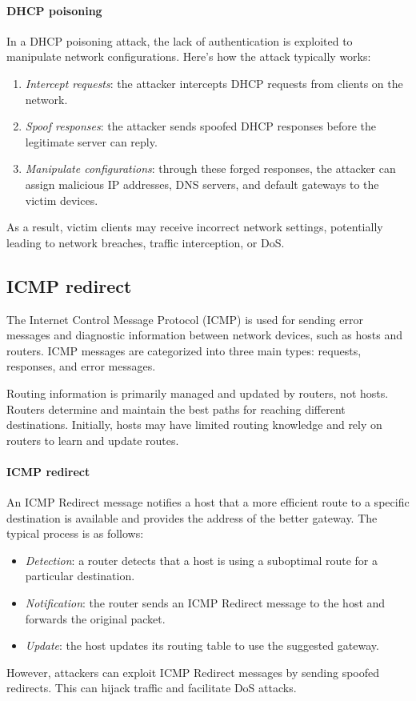 \paragraph*{DHCP poisoning}
In a DHCP poisoning attack, the lack of authentication is exploited to manipulate network configurations. 
Here's how the attack typically works:
\begin{enumerate}
    \item \textit{Intercept requests}: the attacker intercepts DHCP requests from clients on the network.
    \item \textit{Spoof responses}: the attacker sends spoofed DHCP responses before the legitimate server can reply.
    \item \textit{Manipulate configurations}: through these forged responses, the attacker can assign malicious IP addresses, DNS servers, and default gateways to the victim devices.
\end{enumerate}
As a result, victim clients may receive incorrect network settings, potentially leading to network breaches, traffic interception, or DoS.

\subsection{ICMP redirect}
The Internet Control Message Protocol (ICMP) is used for sending error messages and diagnostic information between network devices, such as hosts and routers. 
ICMP messages are categorized into three main types: requests, responses, and error messages.

Routing information is primarily managed and updated by routers, not hosts.
Routers determine and maintain the best paths for reaching different destinations. 
Initially, hosts may have limited routing knowledge and rely on routers to learn and update routes.

\paragraph*{ICMP redirect}
An ICMP Redirect message notifies a host that a more efficient route to a specific destination is available and provides the address of the better gateway. 
The typical process is as follows:
\begin{itemize}
    \item \textit{Detection}: a router detects that a host is using a suboptimal route for a particular destination.
    \item \textit{Notification}: the router sends an ICMP Redirect message to the host and forwards the original packet.
    \item \textit{Update}: the host updates its routing table to use the suggested gateway.
\end{itemize}
However, attackers can exploit ICMP Redirect messages by sending spoofed redirects. 
This can hijack traffic and facilitate DoS attacks. 